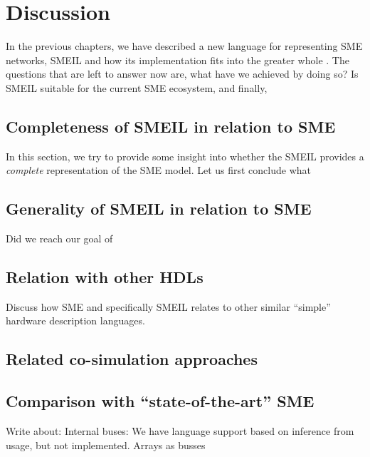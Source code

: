 \chapter{Discussion}

In the previous chapters, we have described a new language for representing SME
networks, SMEIL and how its implementation fits into the greater whole
. The questions that are left to answer now are, what have we
achieved by doing so? Is SMEIL suitable for the current SME ecosystem, and
finally, 

\section{Completeness of SMEIL in relation to SME}
In this section, we try to provide some insight into whether the SMEIL provides
a {\itshape complete} representation of the SME model. Let us first conclude
what 

\section{Generality of SMEIL in relation to SME}
Did we reach our goal of


\section{Relation with other HDLs}
Discuss how SME and specifically SMEIL relates to other similar ``simple''
hardware description languages. 

\section{Related co-simulation approaches}

\section{Comparison with ``state-of-the-art'' SME}
Write about: Internal buses: We have language support based on inference from
usage, but not implemented. Arrays as busses

